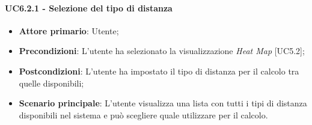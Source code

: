 \paragraph{UC6.2.1 - Selezione del tipo di distanza}
\begin{itemize}
	\item \textbf{Attore primario}: Utente;
	\item \textbf{Precondizioni}: L'utente ha selezionato la visualizzazione \textit{Heat Map} [UC5.2];
	\item \textbf{Postcondizioni}: L'utente ha impostato il tipo di distanza per il calcolo tra quelle disponibili;
	
	\item \textbf{Scenario principale}: L'utente visualizza una lista con tutti i tipi di distanza disponibili nel sistema e può scegliere quale utilizzare per il calcolo.
\end{itemize}
